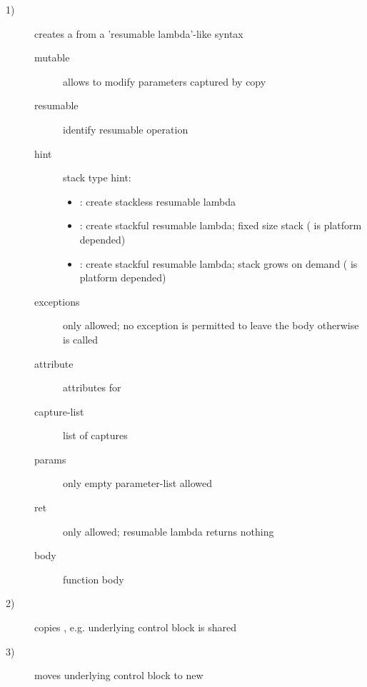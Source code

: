\begin{description}
    \item[1)] creates a \ectx from a 'resumable lambda'-like syntax
              \begin{description}
                  \item[mutable]      allows to modify parameters captured by copy
                  \item[resumable]    identify resumable operation
                  \item[hint]         stack type hint:
                                      \begin{itemize}
                                          \item <no hint specified>: create stackless
                                              resumable lambda
                                          \item {}:
                                              create stackful resumable lambda;
                                              fixed size stack ( is
                                              platform depended)
                                          \item {}:
                                              create stackful resumable lambda;
                                              stack grows on demand (
                                              is platform depended)
                                      \end{itemize}
                  \item[exceptions]   only  allowed; no exception is
                                      permitted to leave the body otherwise
                                       is called
                  \item[attribute]    attributes for 
                  \item[capture-list] list of captures
                  \item[params]       only empty parameter-list allowed
                  \item[ret]          only  allowed; resumable lambda returns nothing
                  \item[body]         function body\\
              \end{description}
    \item[2)] copies \ectx, e.g. underlying control block is shared
    \item[3)] moves underlying control block to new \ectx
\end{description}

